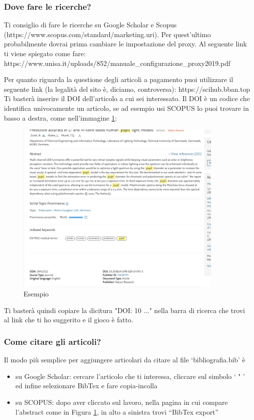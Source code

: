\subsubsection{Dove fare le ricerche?}
Ti consiglio di fare le ricerche su Google Scholar e Scopus (https://www.scopus.com/standard/marketing.uri). Per quest'ultimo probabilmente dovrai prima cambiare le impostazione del proxy. Al seguente link ti viene spiegato come fare:\\ https://www.unisa.it/uploads/852/manuale\_configurazione\_proxy2019.pdf 

\noindent Per quanto riguarda la questione degli articoli a pagamento puoi utilizzare il seguente link (la legalità del sito è, diciamo, controversa):
      https://scihub.bban.top
Ti basterà inserire il DOI dell'articolo a cui sei interessato. Il DOI è un codice che identifica univocamente un articolo, se ad esempio usi SCOPUS lo puoi trovare in basso a destra, come nell'immagine \ref{fig:esempio}:

\begin{figure}[ht!]
    \centering
    \includegraphics[width=4in]{Figure/Schermata 2020-07-22 alle 13.59.57.png}
    \caption{Esempio}
    \label{fig:esempio}
\end{figure}



\noindent Ti basterà quindi copiare la dicitura "DOI: 10 ..." nella barra di ricerca che trovi al link che ti ho suggerito e il gioco è fatto.


\subsubsection{Come citare gli articoli?}
Il modo più semplice per aggiungere articolari da citare al file `bibliografia.bib' è
\begin{itemize}
    \item su Google Scholar: cercare l'articolo che ti interessa, cliccare sul simbolo ` " ' ed infine selezionare BibTex e fare copia-incolla 
    
    \item su SCOPUS: dopo aver cliccato sul lavoro, nella pagina in cui compare l'abstract come in Figura \ref{fig:esempio}, in alto a sinistra trovi ``BibTex export''
\end{itemize}

